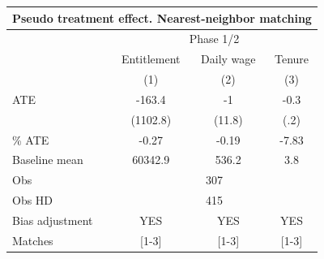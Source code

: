 \begin{tabular}{lccc}
\toprule
\multicolumn{4}{c}{Pseudo treatment effect. Nearest-neighbor matching} \\
\midrule
\midrule
      & \multicolumn{3}{c}{Phase 1/2} \\
\midrule
\midrule
      & Entitlement & Daily wage & Tenure \\
\midrule
\midrule
      & (1)   & (2)   & (3) \\
\midrule
ATE   & -163.4 & -1    & -0.3 \\
      & (1102.8) & (11.8) & (.2) \\
\% ATE & -0.27 & -0.19 & -7.83 \\
Baseline mean & 60342.9 & 536.2 & 3.8 \\
Obs   & \multicolumn{3}{c}{307} \\
Obs HD & \multicolumn{3}{c}{415} \\
Bias adjustment & YES   & YES   & YES \\
Matches & [1-3] & [1-3] & [1-3] \\
\bottomrule
\bottomrule
\end{tabular}%
